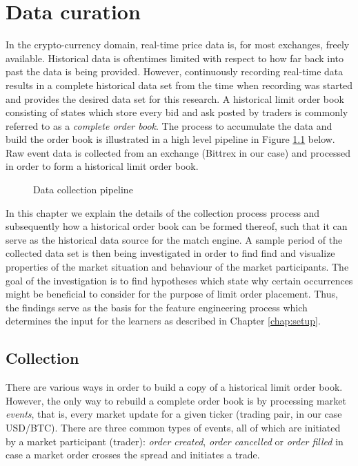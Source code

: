 \chapter{Data curation}
\label{chap:data}

In the crypto-currency domain, real-time price data is, for most exchanges, freely available. Historical data is oftentimes limited with respect to how far back into past the data is being provided. However, continuously recording real-time data results in a complete historical data set from the time when recording was started and provides the desired data set for this research.
A historical limit order book consisting of states which store every bid and ask posted by traders is commonly referred to as a \textit{complete order book}.
The process to accumulate the data and build the order book is illustrated in a high level pipeline in Figure \ref{fig:data-pipeline} below.
Raw event data is collected from an exchange (Bittrex in our case) and processed in order to form a historical limit order book.
\begin{figure}[H]
    \centering
    \caption{Data collection pipeline}
    \label{fig:data-pipeline}
\end{figure}

In this chapter we explain the details of the collection process process and subsequently how a historical order book can be formed thereof, such that it can serve as the historical data source for the match engine.
A sample period of the collected data set is then being investigated in order to find find and visualize properties of the market situation and behaviour of the market participants.
The goal of the investigation is to find hypotheses which state why certain occurrences might be beneficial to consider for the purpose of limit order placement.
Thus, the findings serve as the basis for the feature engineering process which determines the input for the learners as described in Chapter \ref{chap:setup}.

\section{Collection}

There are various ways in order to build a copy of a historical limit order book. However, the only way to rebuild a complete order book is by processing market \textit{events}, that is, every market update for a given ticker (trading pair, in our case USD/BTC).
There are three common types of events, all of which are initiated by a market participant (trader): \textit{order created}, \textit{order cancelled} or \textit{order filled} in case a market order crosses the spread and initiates a trade.

